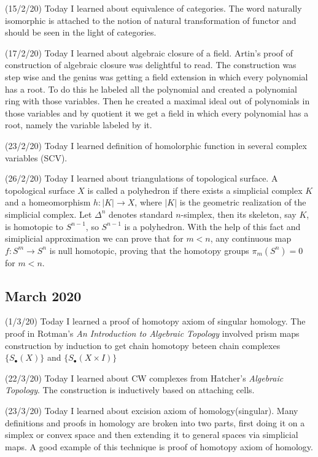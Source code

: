 \documentclass[12pt,a4paper]{article}
\begin{document}
(15/2/20) Today I learned about equivalence of categories. The word naturally isomorphic is attached to the notion of natural transformation of functor and should be seen in the light of categories.

(17/2/20) Today I learned about algebraic closure of a field. Artin's proof of construction of algebraic closure was delightful to read. The construction was step wise and the genius was getting a field extension in which every polynomial has a root. To do this he labeled all the polynomial and created a polynomial ring with those variables. Then he created a maximal ideal out of polynomials in those variables and by quotient it we get a field in which every polynomial has a root, namely the variable labeled by it.

(23/2/20) Today I learned definition of homolorphic function in several complex variables (SCV).

(26/2/20) Today I learned about triangulations of topological surface. A topological surface $X$ is called a polyhedron if there exists a simplicial complex $K$ and a homeomorphism $h : |K| \to X$, where $|K|$ is the geometric realization of the simplicial complex. Let $\Delta^n$ denotes standard $n$-simplex, then its skeleton, say $K$, is homotopic to $S^{n-1}$, so $S^{n-1}$ is a polyhedron. With the help of this fact and simiplicial approximation we can prove that for $m<n$, any continuous map $f: S^m \to S^n$ is null homotopic, proving that the homotopy groups $\pi_m(S^n) = 0$ for $m<n$.

\subsection*{March 2020}

\quad (1/3/20) Today I learned a proof of homotopy axiom of singular homology. The proof in Rotman's \textit{An Introduction to Algebraic Topology} involved prism maps construction by induction to get chain homotopy beteen chain complexes $\{S_\bullet(X)\}$ and $\{S_\bullet(X \times I)\}$

(22/3/20) Today I learned about CW complexes from Hatcher's \textit{Algebraic Topology}. The construction is inductively based on attaching cells.

(23/3/20) Today I learned about excision axiom of homology(singular). Many definitions and proofs in homology are broken into two parts, first doing it on a simplex or convex space and then extending it to general spaces via simplicial maps. A good example of this technique is proof of homotopy axiom of homology. 
\end{document}
